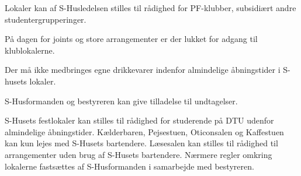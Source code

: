 \begin{list}{•}
\item Lokaler kan af S-Husledelsen stilles til rådighed for PF-klubber, subsidiært andre studentergrupperinger.
\item På dagen for joints og store arrangementer er der lukket for adgang til klublokalerne.
\item Der må ikke medbringes egne drikkevarer indenfor almindelige åbningstider i S-husets lokaler.
\item S-Husformanden og bestyreren kan give tilladelse til undtagelser.
\item S-Husets festlokaler kan stilles til rådighed for studerende på DTU udenfor almindelige åbningstider.
Kælderbaren, Pejsestuen, Oticonsalen og Kaffestuen kan kun lejes med S-Husets bartendere. Læsesalen kan
stilles til rådighed til arrangementer uden brug af S-Husets bartendere. Nærmere regler omkring lokalerne
fastsættes af S-Husformanden i samarbejde med bestyreren.
\end{list}

